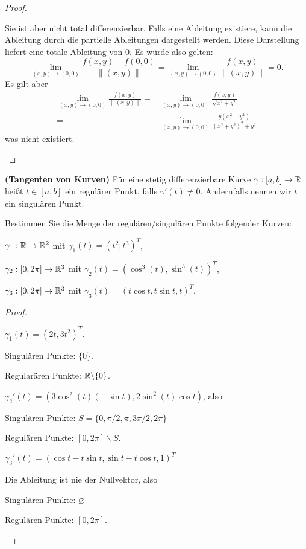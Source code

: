 \begin{proof}
\begin{parts}
	Sie ist aber nicht total differenzierbar. Falls eine Ableitung existiere, kann die Ableitung durch die partielle Ableitungen dargestellt werden. Diese Darstellung liefert eine totale Ableitung von $0$. Es würde also gelten:
	\[
		\lim_{(x,y) \to (0,0)} \frac{f(x,y)-f(0,0)}{\|(x,y)\|}=\lim_{(x,y) \to (0,0)} \frac{f(x,y)}{\|(x,y)\|}= 0
	.\]
	Es gilt aber
	\begin{align*}
		\lim_{(x,y) \to (0,0)} \frac{f(x,y)}{\|(x,y)\|}=& \lim_{(x,y) \to (0,0)}  \frac{f(x,y)}{\sqrt{x^2+y^2} }\\
		=&\lim_{(x,y) \to (0,0)} \frac{y(x^2+y^2)}{(x^2+y^2)^2+y^2}
	\end{align*}
	was nicht existiert.\qedhere
	\end{parts}
\end{proof}
\begin{Problem}
	\textbf{(Tangenten von Kurven)} Für eine stetig differenzierbare Kurve $\gamma:[a,b]\to \mathbb{R}$ heißt $t\in [a,b]$ ein regulärer Punkt, falls $\gamma'(t)\neq 0$. Andernfalls nennen wir $t$ ein singulären Punkt.

Bestimmen Sie die Menge der regulären/singulären Punkte folgender Kurven:	
\begin{parts}
\item $\gamma_1:\mathbb{R}\to \mathbb{R}^2$ mit $\gamma_1(t)=(t^2,t^3)^T$,
\item $\gamma_2:[0,2\pi]\to \mathbb{R}^3$ mit $\gamma_2(t)=(\cos^3(t),\sin^3(t))^T$,
\item $\gamma_3:[0,2\pi]\to \mathbb{R}^3$ mit $\gamma_3(t)=(t\cos t,t\sin t, t)^T$.
\end{parts}
\end{Problem}
\begin{proof}
	\begin{parts}
	\item $\gamma_1(t)=(2t,3t^2)^T$.

		Singulären Punkte: $\{0\} $.
		
		Regularären Punkte: $\mathbb{R}\backslash \{0\} $.
	\item $\gamma_2'(t)=(3\cos^2(t)(-\sin t), 2\sin^2(t)\cos t)$, also

		Singulären Punkte: $S=\{0,\pi / 2, \pi, 3\pi / 2, 2\pi\} $

		Regulären Punkte: $[0,2\pi] \backslash S$.
	\item  $\gamma_3'(t)=(\cos t-t\sin t,\sin t-t\cos t,1)^T$

		Die Ableitung ist nie der Nullvektor, also

		Singulären Punkte: $\varnothing$ 

		Regulären Punkte: $[0,2\pi]$.\qedhere
	\end{parts}
\end{proof}
